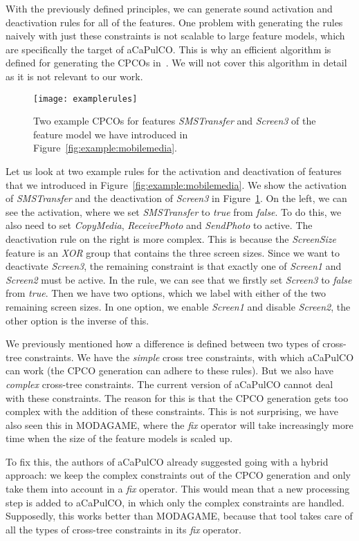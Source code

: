 With the previously defined principles, we can generate sound activation and
deactivation rules for all of the features. One problem with generating the 
rules naively with just these constraints is not scalable to large feature models,
which are specifically the target of aCaPulCO. This is why an efficient algorithm
is defined for generating the CPCOs in~\cite{horcas2022breakit}. We will not cover
this algorithm in detail as it is not relevant to our work.

\begin{figure}
    \texttt{[image: examplerules]}
    \caption{Two example CPCOs for features \emph{SMSTransfer} and \emph{Screen3} of the feature model we have introduced in Figure~\ref{fig:example:mobilemedia}.}
    \label{fig:example:cpcos}
\end{figure}

Let us look at two example rules for the activation and deactivation of features
that we introduced in Figure~\ref{fig:example:mobilemedia}. We show the activation
of \emph{SMSTransfer} and the deactivation of \emph{Screen3} in 
Figure~\ref{fig:example:cpcos}. On the left, we can see the activation, where we set
\emph{SMSTransfer} to \emph{true} from \emph{false}. To do this, we also need to set
\emph{CopyMedia}, \emph{ReceivePhoto} and \emph{SendPhoto} to active. The deactivation
rule on the right is more complex. This is because the \emph{ScreenSize} feature is an
\emph{XOR} group that contains the three screen sizes. Since we want to deactivate
\emph{Screen3}, the remaining constraint is that exactly one of \emph{Screen1} and
\emph{Screen2} must be active. In the rule, we can see that we firstly set
\emph{Screen3} to \emph{false} from \emph{true}. Then we have two options, which we
label with either of the two remaining screen sizes. In one option, we enable
\emph{Screen1} and disable \emph{Screen2}, the other option is the inverse of this.

We previously mentioned how a difference is defined between two types of cross-tree constraints. We have the \emph{simple} cross tree constraints, with which
aCaPulCO can work (the CPCO generation can adhere to these rules). But we also
have \emph{complex} cross-tree constraints. The current version of aCaPulCO
cannot deal with these constraints. The reason for this is that the CPCO
generation gets too complex with the addition of these constraints. This is not
surprising, we have also seen this in MODAGAME, where the \emph{fix} operator 
will take increasingly more time when the size of the feature models is scaled
up.

To fix this, the authors of aCaPulCO already suggested going with a hybrid
approach: we keep the complex constraints out of the CPCO generation and only
take them into account in a \emph{fix} operator. This would mean that a new
processing step is added to aCaPulCO, in which only the complex constraints are
handled. Supposedly, this works better than MODAGAME, because that tool takes
care of all the types of cross-tree constraints in its \emph{fix} operator.


